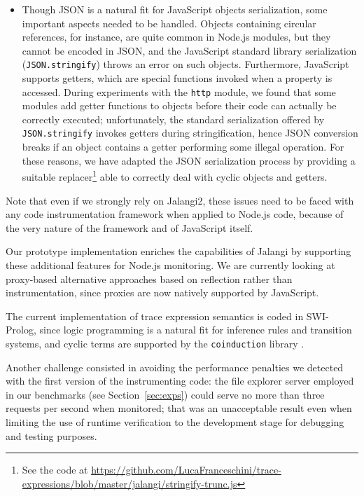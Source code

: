 \begin{itemize}
\item Though JSON is a natural fit for JavaScript objects serialization, some important aspects needed to be handled.
Objects containing circular references, for instance, are quite common in Node.js modules, but they cannot be encoded in JSON, and the JavaScript standard library serialization (\lstinline|JSON.stringify|) throws an error on such objects.
Furthermore, JavaScript supports getters, which are special functions invoked when a property is accessed.
During experiments with the \lstinline{http} module, we found that some modules add getter functions to objects before their code can actually be
correctly executed; unfortunately, the standard serialization offered by \lstinline|JSON.stringify| invokes getters during stringification, hence
JSON conversion  breaks if an object contains a getter performing some illegal operation. 
For these reasons, we have  adapted the JSON serialization process by providing a suitable replacer\footnote{See the code at \url{https://github.com/LucaFranceschini/trace-expressions/blob/master/jalangi/stringify-trunc.js}} able to correctly deal
with cyclic objects and getters.

\end{itemize}
Note that even if we strongly rely on Jalangi2, these issues need to be faced with any code instrumentation framework when applied to Node.js code, because of the very nature of the framework and of JavaScript itself.

Our prototype implementation enriches the capabilities of Jalangi by supporting these additional features for Node.js monitoring.
We are currently looking at proxy-based alternative approaches based on reflection rather than instrumentation, since proxies \cite{proxy} are now natively supported by JavaScript.

The current implementation of trace expression semantics is coded in SWI-Prolog, since logic programming is a natural fit for inference rules and transition systems, and cyclic terms are supported by the \texttt{coinduction} library \cite{CoLP06}.


Another challenge consisted in avoiding the performance penalties we detected with the first version of the
instrumenting code: the file explorer server employed in our benchmarks (see Section~\ref{sec:exps}) could serve no more than
three requests per second when monitored; that was an unacceptable result even when limiting
the use of runtime verification to the development stage for debugging and testing purposes.

